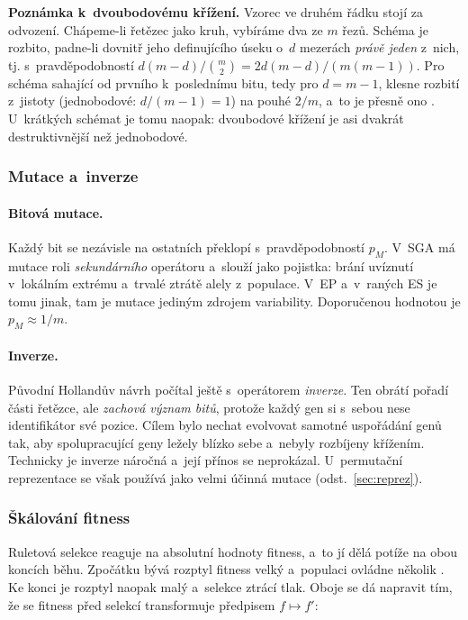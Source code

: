 \documentclass[11pt,a4paper]{article}
\theoremstyle{definition}
\begin{document}
\textbf{Poznámka k~dvoubodovému křížení.} Vzorec ve druhém řádku stojí za odvození.
Chápeme-li řetězec jako kruh, vybíráme dva ze $m$ řezů. Schéma je rozbito, padne-li dovnitř
jeho definujícího úseku o~$d$ mezerách \emph{právě jeden} z~nich, tj. s~pravděpodobností
$d(m-d)/\binom{m}{2} = 2d(m-d)/(m(m-1))$. Pro schéma sahající od prvního
k~poslednímu bitu, tedy pro $d = m-1$, klesne rozbití z~jistoty (jednobodové:
$d/(m-1) = 1$) na pouhé $2/m$, a~to je přesně ono . U~krátkých schémat je tomu naopak: dvoubodové křížení je asi dvakrát
destruktivnější než jednobodové.

\subsubsection{Mutace a~inverze}

\paragraph{Bitová mutace.} Každý bit se nezávisle na ostatních překlopí
s~pravděpodobností $p_M$. V~SGA má mutace roli \emph{sekundárního} operátoru a~slouží
jako pojistka: brání uvíznutí v~lokálním extrému a~trvalé ztrátě alely z~populace.
V~EP a~v~raných ES je tomu jinak, tam je mutace jediným zdrojem variability.
Doporučenou hodnotou je $p_M \approx 1/m$.

\paragraph{Inverze.} Původní Hollandův návrh počítal ještě s~operátorem \emph{inverze}.
Ten obrátí pořadí části řetězce, ale \emph{zachová význam bitů}, protože každý gen si
s~sebou nese identifikátor své pozice. Cílem bylo nechat evolvovat samotné uspořádání genů
tak, aby spolupracující geny ležely blízko sebe a~nebyly rozbíjeny křížením. Technicky je
inverze náročná a~její přínos se neprokázal. U~permutační reprezentace se však používá jako
velmi účinná mutace (odst.~\ref{sec:reprez}).

\subsubsection{Škálování fitness}\label{ssec:skalovani}

Ruletová selekce reaguje na absolutní hodnoty fitness, a~to jí dělá potíže na obou koncích
běhu. Zpočátku bývá rozptyl fitness velký a~populaci ovládne několik . Ke konci
je rozptyl naopak malý a~selekce ztrácí tlak. Oboje se dá napravit tím, že se fitness před
selekcí transformuje předpisem $f \mapsto f'$:
\end{document}
